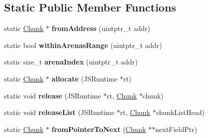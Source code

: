 \subsection*{Static Public Member Functions}
\begin{DoxyCompactItemize}
\item 
\hypertarget{structjs_1_1gc_1_1_chunk_a4feaf1509d2f52caaac028ee58a7fecd}{static \hyperlink{structjs_1_1gc_1_1_chunk}{Chunk} $\ast$ {\bfseries from\-Address} (uintptr\-\_\-t addr)}\label{structjs_1_1gc_1_1_chunk_a4feaf1509d2f52caaac028ee58a7fecd}

\item 
\hypertarget{structjs_1_1gc_1_1_chunk_a69ffed0e7d35ebe3006293a5424ba99c}{static bool {\bfseries within\-Arenas\-Range} (uintptr\-\_\-t addr)}\label{structjs_1_1gc_1_1_chunk_a69ffed0e7d35ebe3006293a5424ba99c}

\item 
\hypertarget{structjs_1_1gc_1_1_chunk_aafb38bcab1f8fc258ecb75d235c47b6d}{static size\-\_\-t {\bfseries arena\-Index} (uintptr\-\_\-t addr)}\label{structjs_1_1gc_1_1_chunk_aafb38bcab1f8fc258ecb75d235c47b6d}

\item 
\hypertarget{structjs_1_1gc_1_1_chunk_a1c50b9adce68d1835ffe8d6b28306428}{static \hyperlink{structjs_1_1gc_1_1_chunk}{Chunk} $\ast$ {\bfseries allocate} (J\-S\-Runtime $\ast$rt)}\label{structjs_1_1gc_1_1_chunk_a1c50b9adce68d1835ffe8d6b28306428}

\item 
\hypertarget{structjs_1_1gc_1_1_chunk_a4f1fba2a1ea3343d5e4b4e3033624d3e}{static void {\bfseries release} (J\-S\-Runtime $\ast$rt, \hyperlink{structjs_1_1gc_1_1_chunk}{Chunk} $\ast$chunk)}\label{structjs_1_1gc_1_1_chunk_a4f1fba2a1ea3343d5e4b4e3033624d3e}

\item 
\hypertarget{structjs_1_1gc_1_1_chunk_aad71e5f32774f7e875995e7e0e8b2396}{static void {\bfseries release\-List} (J\-S\-Runtime $\ast$rt, \hyperlink{structjs_1_1gc_1_1_chunk}{Chunk} $\ast$chunk\-List\-Head)}\label{structjs_1_1gc_1_1_chunk_aad71e5f32774f7e875995e7e0e8b2396}

\item 
\hypertarget{structjs_1_1gc_1_1_chunk_a062da78b4c5f8b19c58f0071c33411ec}{static \hyperlink{structjs_1_1gc_1_1_chunk}{Chunk} $\ast$ {\bfseries from\-Pointer\-To\-Next} (\hyperlink{structjs_1_1gc_1_1_chunk}{Chunk} $\ast$$\ast$next\-Field\-Ptr)}\label{structjs_1_1gc_1_1_chunk_a062da78b4c5f8b19c58f0071c33411ec}


\end{DoxyCompactItemize}
